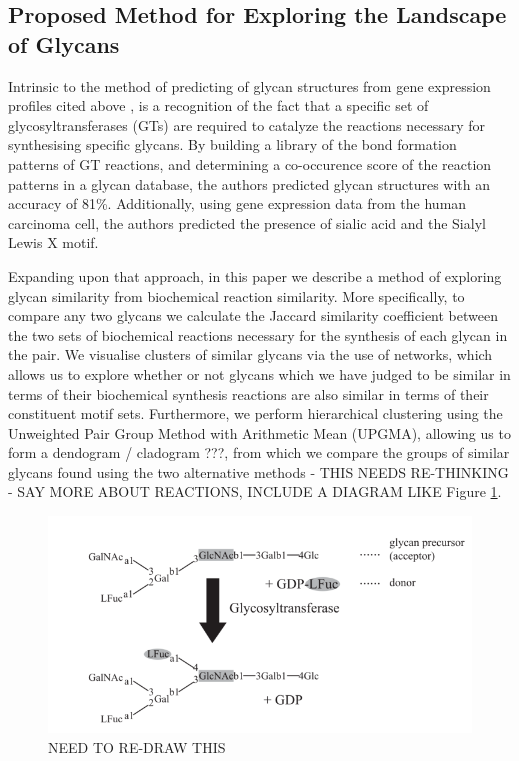 \documentclass[12pt,a4paper]{article}
\begin{document}
\subsection{Proposed Method for Exploring the Landscape of Glycans}
\label{sec:proposed_method}
Intrinsic to the method of predicting of glycan structures from gene expression profiles cited above \citep{doi:10.1093/bioinformatics/bti666}, is a recognition of the fact that a specific set of glycosyltransferases (GTs) are required to catalyze the reactions necessary for synthesising specific glycans. By building a library of the bond formation patterns of GT reactions, and determining a co-occurence score of the reaction patterns in a glycan database, the authors predicted glycan structures with an accuracy of 81\%. Additionally, using gene expression data from the human carcinoma cell, the authors predicted the presence of sialic acid and the Sialyl Lewis X motif.

Expanding upon that approach, in this paper we describe a method of exploring glycan similarity from biochemical reaction similarity. More specifically, to compare any two glycans we calculate the Jaccard similarity coefficient between the two sets of biochemical reactions necessary for the synthesis of each glycan in the pair. We visualise clusters of similar glycans via the use of networks, which allows us to explore whether or not glycans which we have judged to be similar in terms of their biochemical synthesis reactions are also similar in terms of their constituent motif sets. Furthermore, we perform hierarchical clustering using the Unweighted Pair Group Method with Arithmetic Mean (UPGMA), allowing us to form a dendogram / cladogram ???, from which we compare the groups of similar glycans found using the two alternative methods - THIS NEEDS RE-THINKING - SAY MORE ABOUT REACTIONS, INCLUDE A DIAGRAM LIKE Figure \ref{fig:gt_reaction_pattern}.

\begin{figure}[H]
\centering 
\includegraphics[scale=0.8]{images/gt_reaction_pattern.png} 
\caption{NEED TO RE-DRAW THIS}
\label{fig:gt_reaction_pattern}
\end{figure}
\end{document}
